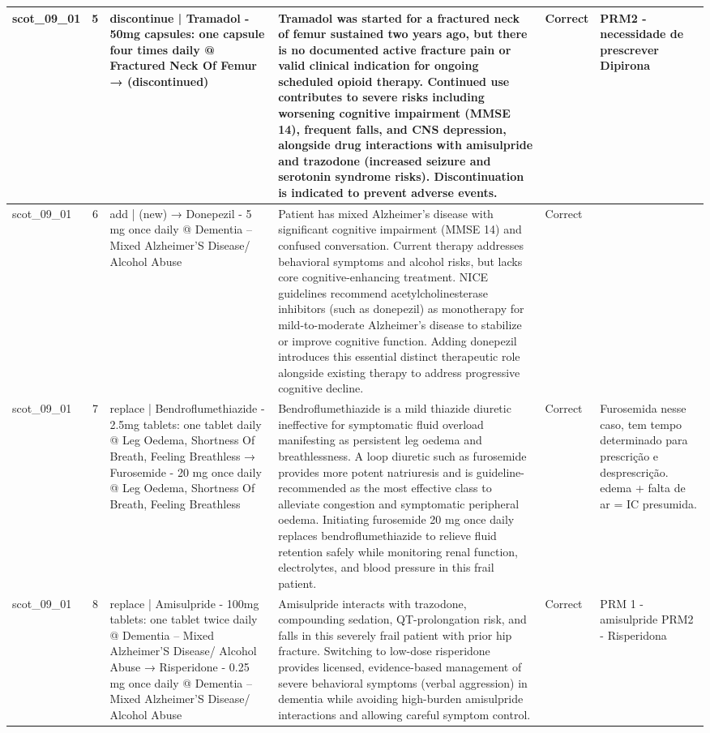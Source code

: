 \begin{longtable}{|p{1.45cm}|c|p{3.3cm}|p{6.5cm}|p{1.55cm}|p{2.3cm}|}
\hline
scot\_09\_01 & 5 & discontinue | Tramadol - 50mg capsules: one capsule four times daily @ Fractured Neck Of Femur → (discontinued) & Tramadol was started for a fractured neck of femur sustained two years ago, but there is no documented active fracture pain or valid clinical indication for ongoing scheduled opioid therapy. Continued use contributes to severe risks including worsening cognitive impairment (MMSE 14), frequent falls, and CNS depression, alongside drug interactions with amisulpride and trazodone (increased seizure and serotonin syndrome risks). Discontinuation is indicated to prevent adverse events. & Correct & PRM2 -  necessidade de prescrever Dipirona \\
\hline
scot\_09\_01 & 6 & add | (new) → Donepezil - 5 mg once daily @ Dementia – Mixed Alzheimer’S Disease/ Alcohol Abuse & Patient has mixed Alzheimer's disease with significant cognitive impairment (MMSE 14) and confused conversation. Current therapy addresses behavioral symptoms and alcohol risks, but lacks core cognitive-enhancing treatment. NICE guidelines recommend acetylcholinesterase inhibitors (such as donepezil) as monotherapy for mild-to-moderate Alzheimer's disease to stabilize or improve cognitive function. Adding donepezil introduces this essential distinct therapeutic role alongside existing therapy to address progressive cognitive decline. & Correct &  \\
\hline
scot\_09\_01 & 7 & replace | Bendroflumethiazide - 2.5mg tablets: one tablet daily @ Leg Oedema, Shortness Of Breath, Feeling Breathless → Furosemide - 20 mg once daily @ Leg Oedema, Shortness Of Breath, Feeling Breathless & Bendroflumethiazide is a mild thiazide diuretic ineffective for symptomatic fluid overload manifesting as persistent leg oedema and breathlessness. A loop diuretic such as furosemide provides more potent natriuresis and is guideline-recommended as the most effective class to alleviate congestion and symptomatic peripheral oedema. Initiating furosemide 20 mg once daily replaces bendroflumethiazide to relieve fluid retention safely while monitoring renal function, electrolytes, and blood pressure in this frail patient. & Correct & Furosemida nesse caso, tem tempo determinado para prescrição e desprescrição.   edema + falta de ar = IC presumida. \\
\hline
scot\_09\_01 & 8 & replace | Amisulpride - 100mg tablets: one tablet twice daily @ Dementia – Mixed Alzheimer’S Disease/ Alcohol Abuse → Risperidone - 0.25 mg once daily @ Dementia – Mixed Alzheimer’S Disease/ Alcohol Abuse & Amisulpride interacts with trazodone, compounding sedation, QT-prolongation risk, and falls in this severely frail patient with prior hip fracture. Switching to low-dose risperidone provides licensed, evidence-based management of severe behavioral symptoms (verbal aggression) in dementia while avoiding high-burden amisulpride interactions and allowing careful symptom control. & Correct & PRM 1 - amisulpride  PRM2 - Risperidona \\

\end{longtable}
